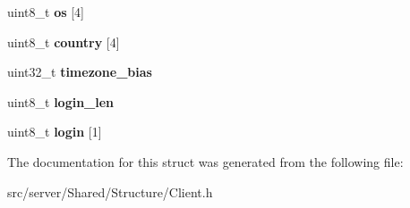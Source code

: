 \begin{DoxyCompactItemize}
\item 
\hypertarget{struct_a_u_t_h___l_o_g_o_n___c_h_a_l_l_e_n_g_e___c_ab1a2af6201b54dcab4f7b486acbc2318}{uint8\-\_\-t {\bfseries os} \mbox{[}4\mbox{]}}\label{struct_a_u_t_h___l_o_g_o_n___c_h_a_l_l_e_n_g_e___c_ab1a2af6201b54dcab4f7b486acbc2318}

\item 
\hypertarget{struct_a_u_t_h___l_o_g_o_n___c_h_a_l_l_e_n_g_e___c_a01a5a5f1f6871196ef14b46b01b00ce2}{uint8\-\_\-t {\bfseries country} \mbox{[}4\mbox{]}}\label{struct_a_u_t_h___l_o_g_o_n___c_h_a_l_l_e_n_g_e___c_a01a5a5f1f6871196ef14b46b01b00ce2}

\item 
\hypertarget{struct_a_u_t_h___l_o_g_o_n___c_h_a_l_l_e_n_g_e___c_ae3e396f841fba34f270aee2ebfa8a8b0}{uint32\-\_\-t {\bfseries timezone\-\_\-bias}}\label{struct_a_u_t_h___l_o_g_o_n___c_h_a_l_l_e_n_g_e___c_ae3e396f841fba34f270aee2ebfa8a8b0}

\item 
\hypertarget{struct_a_u_t_h___l_o_g_o_n___c_h_a_l_l_e_n_g_e___c_ad395212aa21e73ccd09ad1c8c89d56b3}{uint8\-\_\-t {\bfseries login\-\_\-len}}\label{struct_a_u_t_h___l_o_g_o_n___c_h_a_l_l_e_n_g_e___c_ad395212aa21e73ccd09ad1c8c89d56b3}

\item 
\hypertarget{struct_a_u_t_h___l_o_g_o_n___c_h_a_l_l_e_n_g_e___c_a7927c7d748c63f13e57784dc162b2932}{uint8\-\_\-t {\bfseries login} \mbox{[}1\mbox{]}}\label{struct_a_u_t_h___l_o_g_o_n___c_h_a_l_l_e_n_g_e___c_a7927c7d748c63f13e57784dc162b2932}

\end{DoxyCompactItemize}


The documentation for this struct was generated from the following file\-:\begin{DoxyCompactItemize}
\item 
src/server/\-Shared/\-Structure/Client.\-h\end{DoxyCompactItemize}
